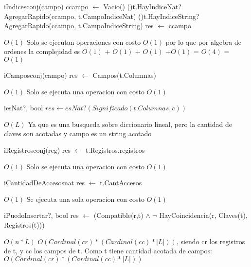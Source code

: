 \begin{Algoritmos}
  \begin{algoritmo}{iIndices}{}{conj(campo)}
    ccampo $\leftarrow$ Vacio() 
    \If(){t.HayIndiceNat?}{
    	AgregarRapido(ccampo, t.CampoIndiceNat) 
    }
    \If(){t.HayIndiceString?}{
    	AgregarRapido(ccampo, t.CampoIndiceString) 
    }
    res $\leftarrow$ ccampo 
  \end{algoritmo}
  \datosAlgoritmo{} %
  {} %
  {} %
  {$O(1)$} %
  {Solo se ejecutan operaciones con costo $O(1)$ por lo que por algebra de ordenes la complejidad es $O(1)$ + $O(1)$ + $O(1)$ +$O(1)$ = $O(4)$ = $O(1)$ } %

  \begin{algoritmo}{iCampos}{}{conj(campo)}
    res $\leftarrow$ Campos(t.Columnas) 
  \end{algoritmo}
  \datosAlgoritmo{} %
  {} %
  {} %
  {$O(1)$} %
  {Solo se ejecuta una operacion con costo $O(1)$} %

  \begin{algoritmo}{iesNat?}{, }{bool}
	$res \gets esNat?(Significado(t.Columnas, c))$ 
  \end{algoritmo}
  \datosAlgoritmo{} %
  {} %
  {} %
  {$O(L)$} %
  {Ya que es una busqueda sobre diccionario lineal, pero la cantidad de claves son acotadas y campo es un string acotado} %

  \begin{algoritmo}{iRegistros}{}{conj(reg)}
    res $\leftarrow$ t.Registros.registros 
  \end{algoritmo}
  \datosAlgoritmo{} %
  {} %
  {} %
  {$O(1)$} %
  {Solo se ejecuta una operacion con costo $O(1)$ } %

  \begin{algoritmo}{iCantidadDeAccesos}{}{nat}
    res $\leftarrow$ t.CantAccesos 
  \end{algoritmo}
  \datosAlgoritmo{} %
  {} %
  {} %
  {$O(1)$} %
  {Se ejecuta una sola operacion con costo $O(1)$} %

 \begin{algoritmo}{iPuedoInsertar?}{, }{bool}
	res $\leftarrow$ (Compatible(r,t) $\wedge$ $\neg$ HayCoincidencia(r, Claves(t), Registros(t))) 
  \end{algoritmo}
  \datosAlgoritmo{} %
  {} %
  {} %
  {$O(n*L)$} %
  {$O(Cardinal(cr) * (Cardinal(cc) * |L|))$, siendo cr los registros de t, y cc los campos de t. Como t tiene cantidad acotada de campos:
  $O(Cardinal(cr) * (Cardinal(cc) * |L|))$} %


\end{Algoritmos}
